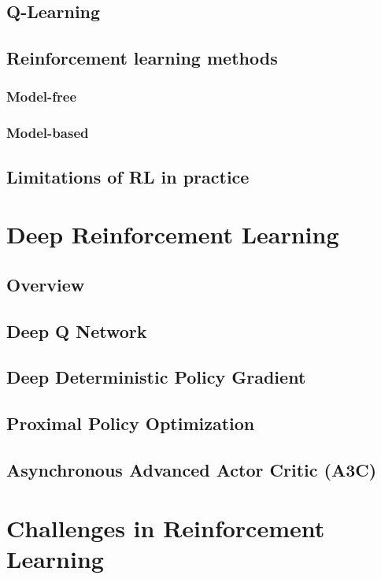 \subsection{Q-Learning}
\subsection{Reinforcement learning methods}
    \subsubsection{Model-free}
    \subsubsection{Model-based}
\subsection{Limitations of RL in practice}




\section{Deep Reinforcement Learning}

\subsection{Overview}
\subsection{Deep Q Network}
\subsection{Deep Deterministic Policy Gradient}
\subsection{Proximal Policy Optimization}
\subsection{Asynchronous Advanced Actor Critic (\textbf{A3C})}


\section{Challenges in Reinforcement Learning}